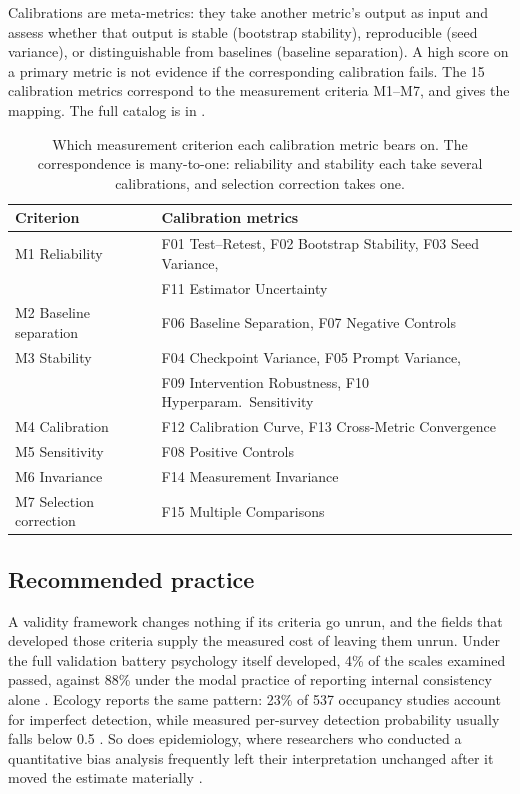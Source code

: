 \documentclass{article}
\begin{document}
Calibrations are meta-metrics: they take another metric's output as input and assess whether that output is stable (bootstrap stability), reproducible (seed variance), or distinguishable from baselines (baseline separation). A high score on a primary metric is not evidence if the corresponding calibration fails. The 15 calibration metrics correspond to the measurement criteria M1--M7, and  gives the mapping. The full catalog is in .

\begin{table}[H]
\centering
\small
\caption{Which measurement criterion each calibration metric bears on.  The
correspondence is many-to-one: reliability and stability each take several
calibrations, and selection correction takes one.}
\label{tab:f-to-m}
\renewcommand{\arraystretch}{1.15}
\begin{tabular}{@{}ll@{}}
\toprule
\textbf{Criterion} & \textbf{Calibration metrics} \\
\midrule
M1 Reliability          & F01 Test--Retest, F02 Bootstrap Stability, F03 Seed Variance, \\
                        & F11 Estimator Uncertainty \\
\addlinespace[2pt]
M2 Baseline separation  & F06 Baseline Separation, F07 Negative Controls \\
\addlinespace[2pt]
M3 Stability            & F04 Checkpoint Variance, F05 Prompt Variance, \\
                        & F09 Intervention Robustness, F10 Hyperparam.\ Sensitivity \\
\addlinespace[2pt]
M4 Calibration          & F12 Calibration Curve, F13 Cross-Metric Convergence \\
\addlinespace[2pt]
M5 Sensitivity          & F08 Positive Controls \\
\addlinespace[2pt]
M6 Invariance           & F14 Measurement Invariance \\
\addlinespace[2pt]
M7 Selection correction & F15 Multiple Comparisons \\
\bottomrule
\end{tabular}
\end{table}


\subsection{Recommended practice}
\label{sec:design}
A validity framework changes nothing if its criteria go unrun, and the fields that developed those criteria supply the measured cost of leaving them unrun. Under the full validation battery psychology itself developed, 4\% of the scales examined passed, against 88\% under the modal practice of reporting internal consistency alone \citep{hussey2020hidden}. Ecology reports the same pattern: 23\% of 537 occupancy studies account for imperfect detection, while measured per-survey detection probability usually falls below 0.5 \citep{kellner2014accounting}. So does epidemiology, where researchers who conducted a quantitative bias analysis frequently left their interpretation unchanged after it moved the estimate materially \citep{petersen2021systematic}.
\end{document}
